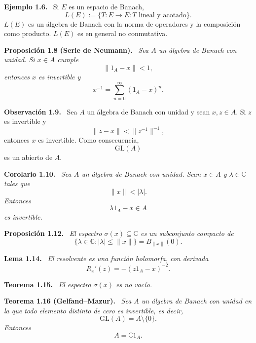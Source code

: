 \documentclass[11pt]{article}
\newcommand{\GL}{\mathrm{GL}}
\newenvironment{teorema}[1]
  {\par\medskip\noindent\textbf{Teorema #1.}\ \itshape}
  {\par\medskip}
\newenvironment{proposicion}[1]
  {\par\medskip\noindent\textbf{Proposición #1.}\ \itshape}
  {\par\medskip}
\newenvironment{corolario}[1]
  {\par\medskip\noindent\textbf{Corolario #1.}\ \itshape}
  {\par\medskip}
\newenvironment{lema}[1]
  {\par\medskip\noindent\textbf{Lema #1.}\ \itshape}
  {\par\medskip}
\newenvironment{observacion}[1]
  {\par\medskip\noindent\textbf{Observación #1.}\ }
  {\par\medskip}
\newenvironment{ejemplo}[1]
  {\par\medskip\noindent\textbf{Ejemplo #1.}\ }
  {\par\medskip}
\begin{document}
\begin{ejemplo}{1.6}
Si $E$ es un espacio de Banach,
\[
  L(E):=\{T:E\to E:T\text{ lineal y acotado}\}.
\]
$L(E)$ es un álgebra de Banach con la norma de operadores y la composición como producto. $L(E)$ es en general no conmutativa.
\end{ejemplo}

\begin{proposicion}{1.8 (Serie de Neumann)}
Sea $A$ un álgebra de Banach con unidad. Si $x\in A$ cumple
\[
  \lVert 1_A-x\rVert<1,
\]
entonces $x$ es invertible y
\[
  x^{-1}=\sum_{n=0}^{\infty}(1_A-x)^n.
\]
\end{proposicion}

\begin{observacion}{1.9}
Sea $A$ un álgebra de Banach con unidad y sean $x,z\in A$. Si $z$ es invertible y
\[
  \lVert z-x\rVert<\lVert z^{-1}\rVert^{-1},
\]
entonces $x$ es invertible. Como consecuencia,
\[
  \GL(A)
\]
es un abierto de $A$.
\end{observacion}

\begin{corolario}{1.10}
Sea $A$ un álgebra de Banach con unidad. Sean $x\in A$ y $\lambda\in\mathbb{C}$ tales que
\[
  \lVert x\rVert<|\lambda|.
\]
Entonces
\[
  \lambda 1_A-x\in A
\]
es invertible.
\end{corolario}

\begin{proposicion}{1.12}
El espectro $\sigma(x)\subseteq\mathbb{C}$ es un subconjunto compacto de
\[
  \{\lambda\in\mathbb{C}:|\lambda|\leq\lVert x\rVert\}
  =B_{\lVert x\rVert}(0).
\]
\end{proposicion}

\begin{lema}{1.14}
El resolvente es una función holomorfa, con derivada
\[
  R_x'(z)=-(z1_A-x)^{-2}.
\]
\end{lema}

\begin{teorema}{1.15}
El espectro $\sigma(x)$ es no vacío.
\end{teorema}

\begin{teorema}{1.16 (Gelfand--Mazur)}
Sea $A$ un álgebra de Banach con unidad en la que todo elemento distinto de cero es invertible, es decir,
\[
  \GL(A)=A\setminus\{0\}.
\]
Entonces
\[
  A=\mathbb{C}1_A.
\]
\end{teorema}
\end{document}
